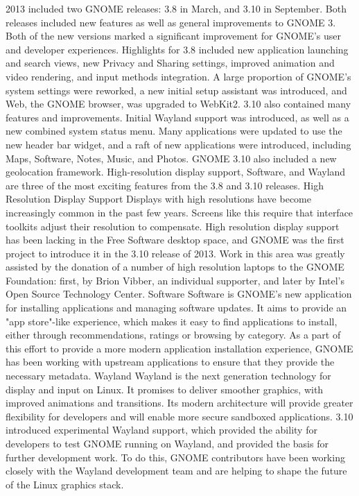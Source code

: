 \documentclass{scrreprt}
\begin{document}
2013 included two GNOME releases: 3.8 in March, and 3.10 in September. Both releases included new features as well as general improvements to GNOME 3. Both of the new versions marked a significant improvement for GNOME's user and developer experiences.
Highlights for 3.8 included new application launching and search views, new Privacy and Sharing settings, improved animation and video rendering, and input methods integration. A large proportion of GNOME's system settings were reworked, a new initial setup assistant was introduced, and Web, the GNOME browser, was upgraded to WebKit2.
3.10 also contained many features and improvements. Initial Wayland support was introduced, as well as a new combined system status menu. Many applications were updated to use the new header bar widget, and a raft of new applications were introduced, including Maps, Software, Notes, Music, and Photos. GNOME 3.10 also included a new geolocation framework.
High-resolution display support, Software, and Wayland are three of the most exciting features from the 3.8 and 3.10 releases.
High Resolution Display Support
Displays with high resolutions have become increasingly common in the past few years. Screens like this require that interface toolkits adjust their resolution to compensate. High resolution display support has been lacking in the Free Software desktop space, and GNOME was the first project to introduce it in the 3.10 release of 2013.
Work in this area was greatly assisted by the donation of a number of high resolution laptops to the GNOME Foundation: first, by Brion Vibber, an individual supporter, and later by Intel's Open Source Technology Center.
Software
Software is GNOME's new application for installing applications and managing software updates. It aims to provide an "app store"-like experience, which makes it easy to find applications to install, either through recommendations, ratings or browsing by category.
As a part of this effort to provide a more modern application installation experience, GNOME has been working with upstream applications to ensure that they provide the necessary metadata.
Wayland
Wayland is the next generation technology for display and input on Linux. It promises to deliver smoother graphics, with improved animations and transitions. Its modern architecture will provide greater flexibility for developers and will enable more secure sandboxed applications.
3.10 introduced experimental Wayland support, which provided the ability for developers to test GNOME running on Wayland, and provided the basis for further development work. To do this, GNOME contributors have been working closely with the Wayland development team and are helping to shape the future of the Linux graphics stack.
\end{document}
